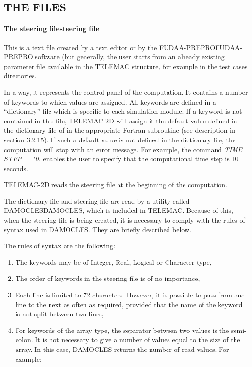 \documentclass{article} %
\begin{document}
\subsection{ THE FILES}


\paragraph{ The steering filesteering file}

 This is a text file created by a text editor or by the FUDAA-PREPROFUDAA-PREPRO software (but generally, the user starts from an already existing parameter file available in the TELEMAC structure, for example in the test cases directories.

 In a way, it represents the control panel of the computation. It contains a number of keywords to which values are assigned. All keywords are defined in a ``dictionary'' file which is specific to each simulation module. If a keyword is not contained in this file, TELEMAC-2D will assign it the default value defined in the dictionary file of in the appropriate Fortran subroutine (see description in section 3.2.15). If such a default value is not defined in the dictionary file, the computation will stop with an error message. For example, the command \textit{TIME STEP = 10}. enables the user to specify that the computational time step is 10 seconds.

 TELEMAC-2D reads the steering file at the beginning of the computation.

 The dictionary file and steering file are read by a utility called DAMOCLESDAMOCLES, which is included in TELEMAC. Because of this, when the steering file is being created, it is necessary to comply with the rules of syntax used in DAMOCLES. They are briefly described below.

 The rules of syntax are the following:

\begin{enumerate}
\item  The keywords may be of Integer, Real, Logical or Character type,

\item  The order of keywords in the steering file is of no importance,

\item  Each line is limited to 72 characters. However, it is possible to pass from one line to the next as often as required, provided that the name of the keyword is not split between two lines,

\item  For keywords of the array type, the separator between two values is the semi-colon. It is not necessary to give a number of values equal to the size of the array. In this case, DAMOCLES returns the number of read values. For example:
\end{enumerate}
\end{document}
